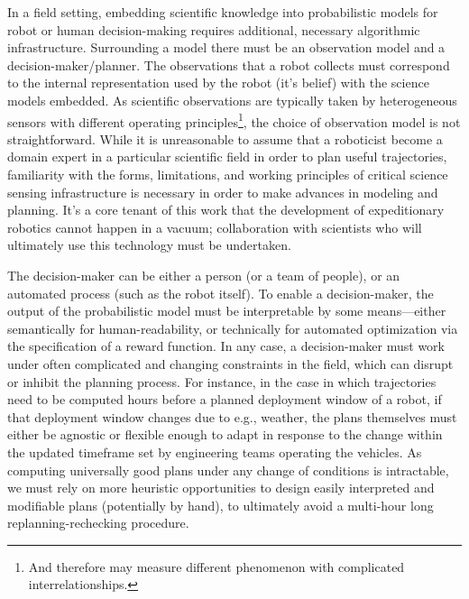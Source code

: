 In a field setting, embedding scientific knowledge into probabilistic models for robot or human decision-making requires additional, necessary algorithmic infrastructure. 
Surrounding a model there must be an observation model and a decision-maker/planner.
The observations that a robot collects must correspond to the internal representation used by the robot (it's belief) with the science models embedded.
As scientific observations are typically taken by heterogeneous sensors with different operating principles\footnote{And therefore may measure different phenomenon with complicated interrelationships.}, the choice of observation model is not straightforward.
While it is unreasonable to assume that a roboticist become a domain expert in a particular scientific field in order to plan useful trajectories, familiarity with the forms, limitations, and working principles of critical science sensing infrastructure is necessary in order to make advances in modeling and planning.
It's a core tenant of this work that the development of expeditionary robotics cannot happen in a vacuum; collaboration with scientists who will ultimately use this technology must be undertaken.

The decision-maker can be either a person (or a team of people), or an automated process (such as the robot itself). 
To enable a decision-maker, the output of the probabilistic model must be interpretable by some means---either semantically for human-readability, or technically for automated optimization via the specification of a reward function.
In any case, a decision-maker must work under often complicated and changing constraints in the field, which can disrupt or inhibit the planning process.
For instance, in the case in which trajectories need to be computed hours before a planned deployment window of a robot, if that deployment window changes due to e.g., weather, the plans themselves must either be agnostic or flexible enough to adapt in response to the change within the updated timeframe set by engineering teams operating the vehicles.
As computing universally good plans under any change of conditions is intractable, we must rely on more heuristic opportunities to design easily interpreted and modifiable plans (potentially by hand), to ultimately avoid a multi-hour long replanning-rechecking procedure.

